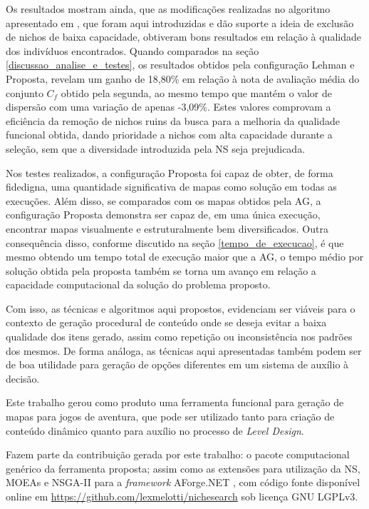 
Os resultados mostram ainda, que as modificações realizadas no algoritmo apresentado em \cite{lehman2011evolving}, que foram aqui introduzidas e dão suporte a ideia de exclusão de nichos de baixa capacidade, obtiveram bons resultados em relação à qualidade dos indivíduos encontrados. Quando comparados na seção \ref{discussao_analise_e_testes}, os resultados obtidos pela configuração Lehman e Proposta, revelam um ganho de 18,80\% em relação à nota de avaliação média do conjunto $C_f$ obtido pela segunda, ao mesmo tempo que mantém o valor de dispersão com uma variação de apenas -3,09\%. Estes valores comprovam a eficiência da remoção de nichos ruins da busca para a melhoria da qualidade funcional obtida, dando prioridade a nichos com alta capacidade durante a seleção, sem que a diversidade introduzida pela NS seja prejudicada.

Nos testes realizados, a configuração Proposta foi capaz de obter, de forma fidedigna, uma quantidade significativa de mapas como solução em todas as execuções. Além disso, se comparados com os mapas obtidos pela AG, a configuração Proposta demonstra ser capaz de, em uma única execução, encontrar mapas visualmente e estruturalmente bem diversificados. Outra consequência disso, conforme discutido na seção \ref{tempo_de_execucao}, é que mesmo obtendo um tempo total de execução maior que a AG, o tempo médio por solução obtida pela proposta também se torna um avanço em relação a capacidade computacional da solução do problema proposto.

Com isso, as técnicas e algoritmos aqui propostos, evidenciam ser viáveis para o contexto de geração procedural de conteúdo onde se deseja evitar a baixa qualidade dos itens gerado, assim como repetição ou inconsistência nos padrões dos mesmos. De forma análoga, as técnicas aqui apresentadas também podem ser de boa utilidade para geração de opções diferentes em um sistema de auxílio à decisão.

Este trabalho gerou como produto uma ferramenta funcional para geração de mapas para jogos de aventura, que pode ser utilizado tanto para criação de conteúdo dinâmico quanto para auxílio no processo de \emph{Level Design}.

Fazem parte da contribuição gerada por este trabalho: o pacote computacional genérico da ferramenta proposta; assim como as extensões para utilização da NS, MOEAs e NSGA-II para a \emph{framework} AForge.NET \cite{kirillov2013aforge}, com  código fonte disponível online em \url{https://github.com/lexmelotti/nichesearch} sob licença GNU LGPLv3.

